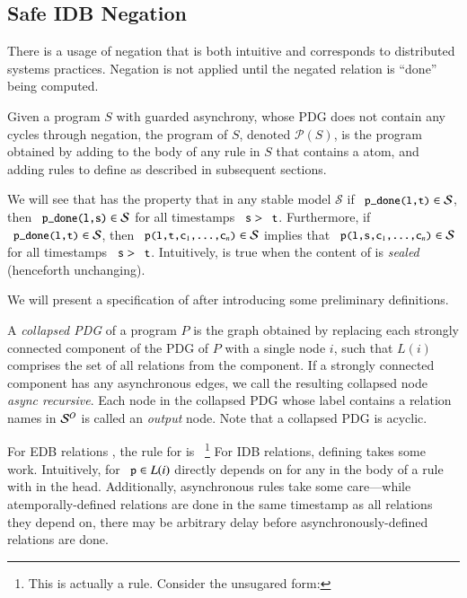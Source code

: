 \subsection{Safe IDB Negation}
\label{sec:perfect-construction}

There is a usage of negation that is both intuitive and corresponds to
distributed systems practices.  Negation is not applied until the negated
relation is ``done'' being computed.

Given a \lang program $S$ with guarded asynchrony, whose PDG does not contain any cycles through negation, the \plang program of $S$, denoted $\mathcal{P}(S)$, is the \lang program obtained by adding  to the body of any rule in $S$ that contains a  atom, and adding rules to define  as described in subsequent sections.

We will see that  has the
property that in any stable model $\mathcal{S}$ if $\dedalus{p_done(l,t)} \in
\mathcal{S}$, then $\dedalus{p_done(l,s)} \in \mathcal{S}$ for all timestamps
$\dedalus{s} > \dedalus{t}$.  Furthermore, if $\dedalus{p_done(l,t)} \in
\mathcal{S}$, then $\dedalus{p(l,t,c\sub{1},\ldots,c\sub{n})} \in \mathcal{S}$
implies that $\dedalus{p(l,s,c\sub{1},\ldots,c\sub{n})} \in \mathcal{S}$ for all
timestamps $\dedalus{s} > \dedalus{t}$.  Intuitively,  is true
when the content of  is {\em sealed} (henceforth unchanging).

We will present a specification of  after introducing some preliminary definitions.

A {\em collapsed PDG} of a \lang program $P$ is the graph obtained by replacing each strongly
connected component of the PDG of $P$ with a single node $i$, such that $L(i)$
comprises
the set of all relations from the component.  If a strongly connected
component has any asynchronous edges, we call the resulting collapsed node {\em
  async recursive}.  Each node in the collapsed PDG whose label contains a
relation names in $\oschema$ is called an {\em output} node.  Note that a
collapsed PDG is acyclic.

For EDB relations , the rule for  is ~\footnote{This is actually a rule.  Consider the unsugared form: }  For
IDB relations, defining  takes some work.  Intuitively,  for $\dedalus{p} \in L(i)$ directly depends on  for any  in the body of a rule with  in the head.  Additionally, asynchronous rules take some care---while atemporally-defined relations are done in the same timestamp as all relations they depend on, there may be arbitrary delay before asynchronously-defined relations are done.


